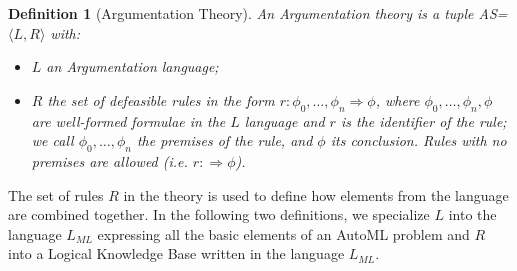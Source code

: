 \documentclass[5p,times]{elsarticle}
\newtheorem{definition}{Definition}
\begin{document}
\begin{definition}[Argumentation Theory]\label{system}
An Argumentation theory is a tuple AS=$\langle L, R \rangle$ with:
\begin{itemize}
    \item $L$ an Argumentation language;
    \item $R$ the set of defeasible rules in the form $r : \phi_0,\ldots, \phi_n \Rightarrow \phi$, where $\phi_0,\ldots, \phi_n,\phi$ are well-formed formulae in the $L$ language and $r$ is the identifier of the rule; we call $\phi_0,\ldots, \phi_n$ the premises of the rule, and $\phi$ its conclusion.
    Rules with no premises are allowed (i.e. $r : \Rightarrow \phi$).
\end{itemize}
\end{definition}

The set of rules $R$ in the theory is used to define how elements from the language are combined together.
In the following two definitions, we specialize $L$ into the language $L_{ML}$ expressing all the basic elements of an AutoML problem and $R$ into a Logical Knowledge Base written in the language $L_{ML}$.
\end{document}
